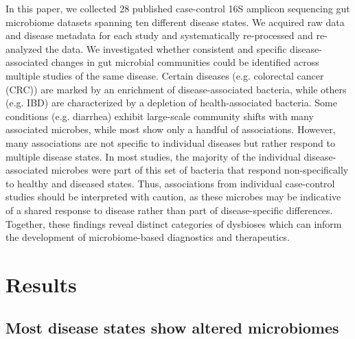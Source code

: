 In this paper, we collected 28 published case-control 16S amplicon sequencing gut microbiome datasets spanning ten different disease states.
We acquired raw data and disease metadata for each study and systematically re-processed and re-analyzed the data.
We investigated whether consistent and specific disease-associated changes in gut microbial communities could be identified across multiple studies of the same disease.
Certain diseases (e.g. colorectal cancer (CRC)) are marked by an enrichment of disease-associated bacteria, while others (e.g. IBD) are characterized by a depletion of health-associated bacteria.
Some conditions (e.g. diarrhea) exhibit large-scale community shifts with many associated microbes, while most show only a handful of associations.
However, many associations are not specific to individual diseases but rather respond to multiple disease states.
In most studies, the majority of the individual disease-associated microbes were part of this set of bacteria that respond non-specifically to healthy and diseased states.
Thus, associations from individual case-control studies should be interpreted with caution, as these microbes may be indicative of a shared response to disease rather than part of disease-specific differences.
Together, these findings reveal distinct categories of dysbioses which can inform the development of microbiome-based diagnostics and therapeutics.

\section{Results}

\subsection{Most disease states show altered microbiomes}

